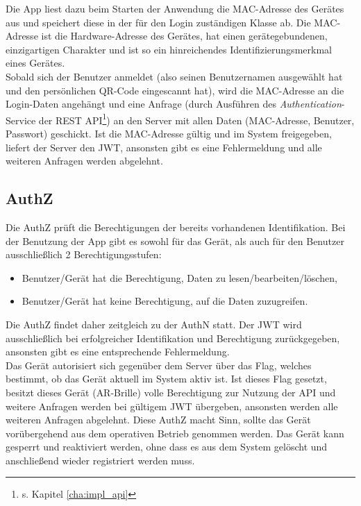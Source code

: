 Die App liest dazu beim Starten der Anwendung die \ac{MAC}-Adresse des Gerätes aus und speichert diese in der für den Login zuständigen Klasse ab. Die \ac{MAC}-Adresse ist die Hardware-Adresse des Gerätes, hat einen gerätegebundenen, einzigartigen Charakter und ist so ein hinreichendes Identifizierungsmerkmal eines Gerätes.\\
Sobald sich der Benutzer anmeldet (also seinen Benutzernamen ausgewählt hat und den persönlichen QR-Code eingescannt hat), wird die \ac{MAC}-Adresse an die Login-Daten angehängt und eine Anfrage (durch Ausführen des \emph{Authentication}-Service der REST API\footnote{s. Kapitel \ref{cha:impl_api}}) an den Server mit allen Daten (\ac{MAC}-Adresse, Benutzer, Passwort) geschickt. Ist die \ac{MAC}-Adresse gültig und im System freigegeben, liefert der Server den \ac{JWT}, ansonsten gibt es eine Fehlermeldung und alle weiteren Anfragen werden abgelehnt.

\subsection{\acf{AuthZ}}
Die \acl{AuthZ} prüft die Berechtigungen der bereits vorhandenen Identifikation. Bei der Benutzung der App gibt es sowohl für das Gerät, als auch für den Benutzer ausschließlich 2 Berechtigungsstufen:
\begin{itemize}
	\item Benutzer/Gerät hat die Berechtigung, Daten zu lesen/bearbeiten/löschen,
	\item Benutzer/Gerät hat keine Berechtigung, auf die Daten zuzugreifen.
\end{itemize}

Die \acl{AuthZ} findet daher zeitgleich zu der \acl{AuthN} statt. Der \ac{JWT} wird ausschließlich bei erfolgreicher Identifikation und Berechtigung zurückgegeben, ansonsten gibt es eine entsprechende Fehlermeldung.\\

Das Gerät autorisiert sich gegenüber dem Server über das Flag, welches bestimmt, ob das Gerät aktuell im System aktiv ist. Ist dieses Flag gesetzt, besitzt dieses Gerät (\zB \acs{AR}-Brille) volle Berechtigung zur Nutzung der \acs{API} und weitere Anfragen werden bei gültigem \ac{JWT} übergeben, ansonsten werden alle weiteren Anfragen abgelehnt. Diese \acl{AuthZ} macht Sinn, sollte das Gerät vorübergehend aus dem operativen Betrieb genommen werden. Das Gerät kann gesperrt und reaktiviert werden, ohne dass es aus dem System gelöscht und anschließend wieder registriert werden muss.\\

